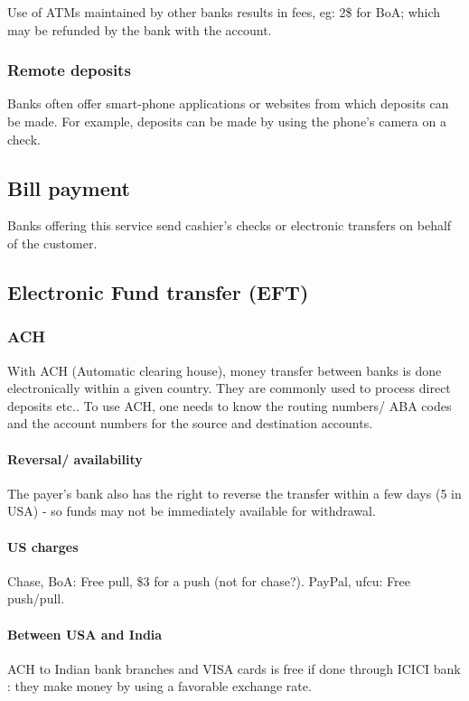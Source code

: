 \documentclass[oneside, article]{memoir}
\begin{document}
Use of ATMs maintained by other banks results in fees, eg: 2\$ for BoA; which may be refunded by the bank with the account.

\subsubsection{Remote deposits}
Banks often offer smart-phone applications or websites from which deposits can be made. For example, deposits can be made by using the phone's camera on a check.

\subsection{Bill payment}
Banks offering this service send cashier's checks or electronic transfers on behalf of the customer.

\subsection{Electronic Fund transfer (EFT)}
\subsubsection{ACH}
With ACH (Automatic clearing house), money transfer between banks is done electronically within a given country. They are commonly used to process direct deposits etc.. To use ACH, one needs to know the routing numbers/ ABA codes and the account numbers for the source and destination accounts.

\paragraph{Reversal/ availability}
The payer's bank also has the right to reverse the transfer within a few days (5 in USA) - so funds may not be immediately available for withdrawal.

\paragraph{US charges}
Chase, BoA: Free pull, \$3 for a push (not for chase?). PayPal, ufcu: Free push/pull.

\paragraph{Between USA and India}
ACH to Indian bank branches and VISA cards is free if done through ICICI bank : they make money by using a favorable exchange rate.
\end{document}
